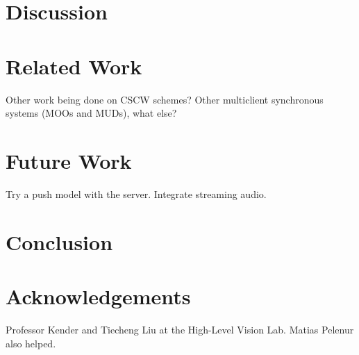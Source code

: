 \documentclass[10pt]{article}
\begin{document}
\section{Discussion} \label{discussion}

\section{Related Work} \label{related}

Other work being done on CSCW schemes?  Other multiclient synchronous 
systems (MOOs and MUDs), what else?

\section{Future Work} \label{con}

Try a push model with the server.  Integrate streaming audio.

\section{Conclusion} \label{con}




\section{Acknowledgements}

Professor Kender and Tiecheng Liu at the High-Level Vision Lab.
Matias Pelenur also helped.



\label{'LastPage'}
\end{document}
